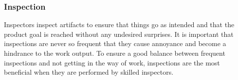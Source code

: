 \subsubsection{Inspection}

Inspectors inspect artifacts to ensure that things go as intended and that the product goal 
is reached without any undesired surprises\cite{scrumguide11}. It is important that 
inspections are never so frequent that they cause annoyance and become a hindrance to the
work output\cite{scrumguide11}. To ensure a good balance between frequent inspections and 
not getting in the way of work, inspections are the most beneficial when they are performed 
by skilled inspectors.